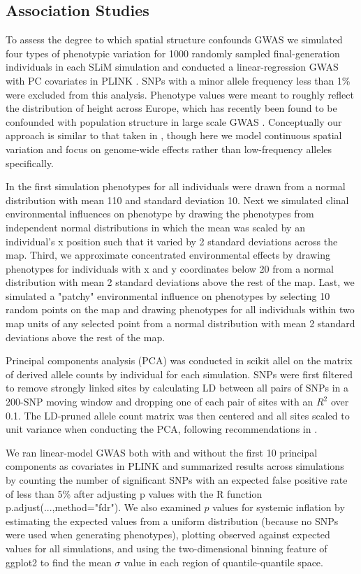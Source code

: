 \documentclass[9pt,twocolumn,twoside,lineno]{gsajnl}
\begin{document}
\subsection{Association Studies}
To assess the degree to which spatial structure confounds GWAS we simulated four types of phenotypic variation for 1000 randomly sampled final-generation individuals in each SLiM simulation and conducted a linear-regression GWAS with PC covariates in PLINK \citep{PURCELL2007}. SNPs with a minor allele frequency less than 1\% were excluded from this analysis. Phenotype values were meant to roughly reflect the distribution of height across Europe, which has recently been found to be confounded with population structure in large scale GWAS \citep{Berg2018,Sohail2018}. Conceptually our approach is similar to that taken in \citep{Mathieson2012}, though here we model continuous spatial variation and focus on genome-wide effects rather than low-frequency alleles specifically. 

In the first simulation phenotypes for all individuals were drawn from a normal distribution with mean 110 and standard deviation 10. Next we simulated clinal environmental influences on phenotype by drawing the phenotypes from independent normal distributions in which the mean was scaled by an individual's x position such that it varied by 2 standard deviations across the map. Third, we approximate concentrated environmental effects by drawing phenotypes for individuals with x and y coordinates below 20 from a normal distribution with mean 2 standard deviations above the rest of the map. Last, we simulated a "patchy" environmental influence on phenotypes by selecting 10 random points on the map and drawing phenotypes for all individuals within two map units of any selected point from a normal distribution with mean 2 standard deviations above the rest of the map. 

Principal components analysis (PCA) was conducted in scikit allel on the matrix of derived allele counts by individual for each simulation. SNPs were first filtered to remove strongly linked sites by calculating LD between all pairs of SNPs in a 200-SNP moving window and dropping one of each pair of sites with an $R^2$ over 0.1. The LD-pruned allele count matrix was then centered and all sites scaled to unit variance when conducting the PCA, following recommendations in \citep{Patterson2006}.   

We ran linear-model GWAS both with and without the first 10 principal components as covariates in PLINK and summarized results across simulations by counting the number of significant SNPs with an expected false positive rate of less than 5\% after adjusting p values with the R function p.adjust(...,method="fdr"). We also examined $p$ values for systemic inflation by estimating the expected values from a uniform distribution (because no SNPs were used when generating phenotypes), plotting observed against expected values for all simulations, and using the two-dimensional binning feature of ggplot2 \citep{Wickham2016} to find the mean $\sigma$ value in each region of quantile-quantile space. 
\end{document}

